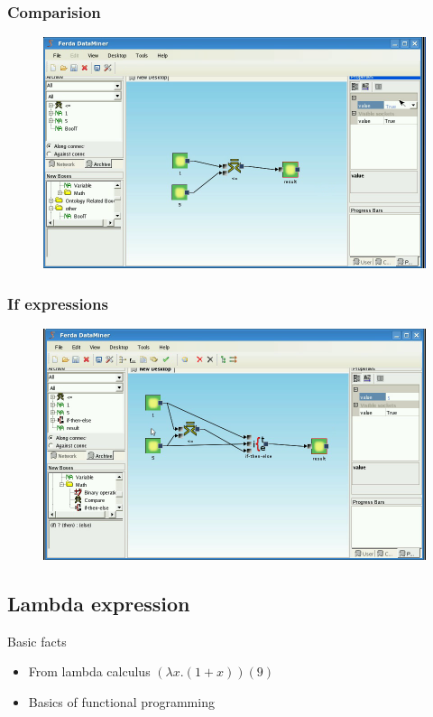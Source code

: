 \documentclass{article}
\begin{document}
\subsubsection{Comparision}
\begin{figure}
\includegraphics[width=12cm]{compare2.png}
	\caption{}
\end{figure}

\subsubsection{If expressions}
\begin{figure}
\includegraphics[width=12cm]{ifthenelse2.png}
	\caption{}
\end{figure}

\subsection{Lambda expression}
Basic facts
\begin{itemize}
	\item From lambda calculus $(\lambda x.(1+x))(9)$
	\item Basics of functional programming
\end{itemize}
\end{document}
